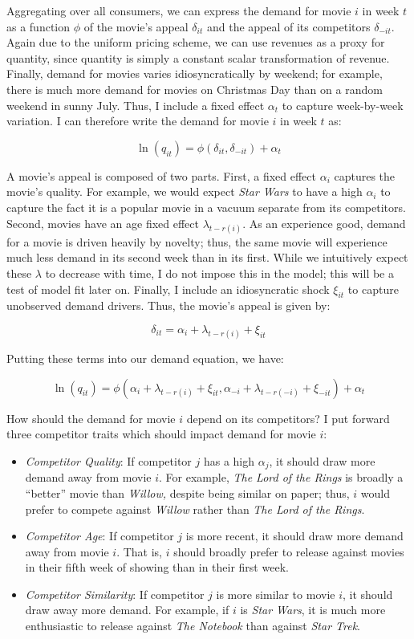 \documentclass{article}
\begin{document}
Aggregating over all consumers, we can express the demand for movie $i$ in week $t$ as a function $\phi$ of the movie's appeal $\delta_{it}$ and the appeal of its competitors $\delta_{-it}$. Again due to the uniform pricing scheme, we can use revenues as a proxy for quantity, since quantity is simply a constant scalar transformation of revenue. Finally, demand for movies varies idiosyncratically by weekend; for example, there is much more demand for movies on Christmas Day than on a random weekend in sunny July. Thus, I include a fixed effect $\alpha_t$ to capture week-by-week variation. I can therefore write the demand for movie $i$ in week $t$ as:

$$\ln(q_{it}) = \phi(\delta_{it}, \delta_{-it}) + \alpha_t$$

A movie's appeal is composed of two parts. First, a fixed effect $\alpha_i$ captures the movie's quality. For example, we would expect \emph{Star Wars} to have a high $\alpha_i$ to capture the fact it is a popular movie in a vacuum separate from its competitors. Second, movies have an age fixed effect $\lambda_{t - r(i)}$. As an experience good, demand for a movie is driven heavily by novelty; thus, the same movie will experience much less demand in its second week than in its first. While we intuitively expect these $\lambda$ to decrease with time, I do not impose this in the model; this will be a test of model fit later on. Finally, I include an idiosyncratic shock $\xi_{it}$ to capture unobserved demand drivers. Thus, the movie's appeal is given by:

$$\delta_{it} = \alpha_i + \lambda_{t - r(i)} + \xi_{it}$$

Putting these terms into our demand equation, we have:

$$\ln(q_{it}) = \phi(\alpha_i + \lambda_{t - r(i)} + \xi_{it}, \alpha_{-i} + \lambda_{t - r(-i)} + \xi_{-it}) + \alpha_t$$

How should the demand for movie $i$ depend on its competitors? I put forward three competitor traits which should impact demand for movie $i$:
\begin{itemize}
    \item \emph{Competitor Quality}: If competitor $j$ has a high $\alpha_j$, it should draw more demand away from movie $i$. For example, \emph{The Lord of the Rings} is broadly a ``better'' movie than \emph{Willow,} despite being similar on paper; thus, $i$ would prefer to compete against \emph{Willow} rather than \emph{The Lord of the Rings}.
    \item \emph{Competitor Age}: If competitor $j$ is more recent, it should draw more demand away from movie $i$. That is, $i$ should broadly prefer to release against movies in their fifth week of showing than in their first week.
    \item \emph{Competitor Similarity}: If competitor $j$ is more similar to movie $i$, it should draw away more demand. For example, if $i$ is \emph{Star Wars}, it is much more enthusiastic to release against \emph{The Notebook} than against \emph{Star Trek}.
\end{itemize}
\end{document}
